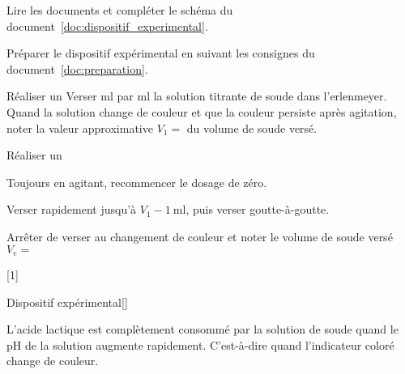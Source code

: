\schematisation Lire les documents et compléter le schéma du document~\ref{doc:dispositif_experimental}.

\mesure Préparer le dispositif expérimental en suivant les consignes du document~\ref{doc:preparation}.

\mesure Réaliser un 
Verser \unit{\ml} par \unit{\ml} la solution titrante de soude dans l'erlenmeyer.
Quand la solution change de couleur et que la couleur persiste après agitation, noter la valeur approximative $V_1 =$  du volume de soude versé.

\mesure Réaliser un 
\begin{protocole}
  \item Toujours en agitant, recommencer le dosage de zéro.
  \item Verser rapidement jusqu'à $V_1 - \qty{1}{\ml}$, puis verser goutte-à-goutte.
  \item Arrêter de verser au changement de couleur et noter le volume de soude versé $V_e =$ 
\end{protocole}

[1]


\begin{doc}{Dispositif expérimental}[\label{doc:dispositif_experimental}]
  \begin{center}
  \end{center}
  \vspace*{-24pt}
  L'acide lactique est complètement consommé par la solution de soude quand le pH de la solution augmente rapidement.
  C'est-à-dire quand l'indicateur coloré change de couleur.
\end{doc}

